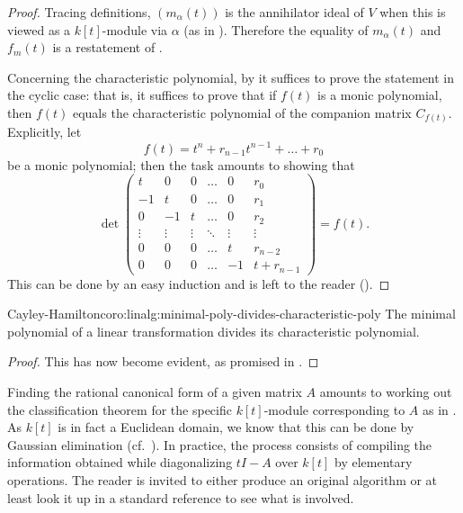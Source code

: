 \begin{proof}
  Tracing definitions, $(m_\alpha(t))$ is the annihilator ideal of $V$
  when this is viewed as a $k[t]$-module via $\alpha$ (as in
  ). Therefore the equality of $m_\alpha(t)$ and
  $f_m(t)$ is a restatement of .

  Concerning the characteristic polynomial, by
   it suffices
  to prove the statement in the cyclic case: that is, it suffices to
  prove that if $f(t)$ is a monic polynomial, then $f(t)$ equals the
  characteristic polynomial of the companion matrix $C_{f(t)}$.
  Explicitly, let
  \[
    f(t) = t^n + r_{n-1} t^{n-1} + \dots + r_0
  \]
  be a monic polynomial; then the task amounts to showing that
  \[
    \det \begin{pmatrix}
      t & 0 & 0 & \dots & 0 & r_0 \\
      -1 & t & 0 & \dots & 0 & r_1 \\
      0 & -1 & t & \dots & 0 & r_2 \\
      \vdots & \vdots & \vdots & \ddots & \vdots & \vdots \\
      0 & 0 & 0 & \dots & t & r_{n-2} \\
      0 & 0 & 0 & \dots & -1 & t + r_{n-1}
    \end{pmatrix} = f(t).
  \]
  This can be done by an easy induction and is left to the reader
  ().
\end{proof}

\begin{coro}{Cayley-Hamilton}{coro:linalg:minimal-poly-divides-characteristic-poly}
  The minimal polynomial of a linear transformation divides its
  characteristic polynomial.
\end{coro}

\begin{proof}
  This has now become evident, as promised in
  .
\end{proof}

Finding the rational canonical form of a given matrix $A$ amounts to
working out the classification theorem for the specific $k[t]$-module
corresponding to $A$ as in . As $k[t]$ is in
fact a Euclidean domain, we know that this can be done by Gaussian
elimination (cf.\
). In
practice, the process consists of compiling the information obtained
while diagonalizing $tI - A$ over $k[t]$ by elementary operations. The
reader is invited to either produce an original algorithm or at least
look it up in a standard reference to see what is involved.

